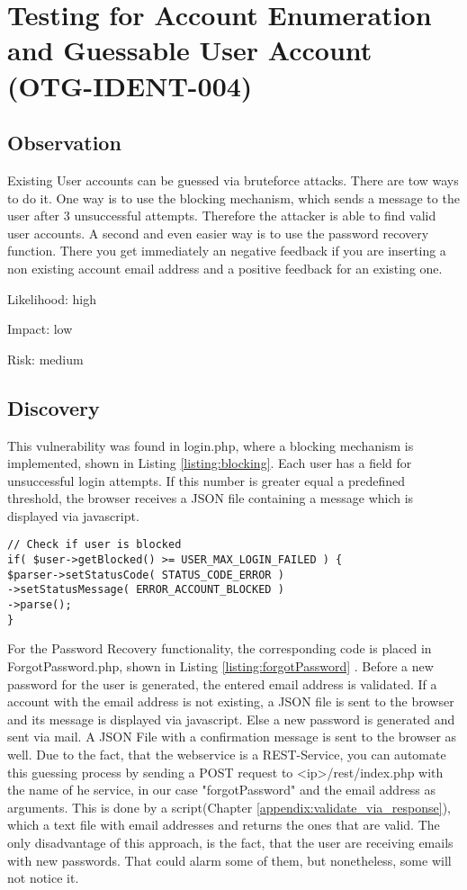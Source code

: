 \chapter{Testing for Account Enumeration and Guessable User Account (OTG-IDENT-004)}
\section{Observation}
Existing User accounts can be guessed via bruteforce attacks. There are tow ways to do it. One way is to use the blocking mechanism, which sends a message to the user after 3 unsuccessful attempts. Therefore the attacker is able to find valid user accounts.
A second and even easier way is to use the  password recovery function. There you get immediately an negative feedback if you are inserting a non existing account email address and a positive feedback for an existing  one.


Likelihood: high \newline

Impact: low\newline

Risk: medium\newline

\section{Discovery}
This vulnerability was found in login.php, where a blocking mechanism is implemented, shown in Listing \ref{listing:blocking}.  Each user has a field for unsuccessful login attempts. If this number is greater equal a predefined threshold, the browser  receives a JSON file containing a message which is displayed via javascript.
\begin{lstlisting}[caption= Blocking Mechanism in login.php line 54-59 ,label=listing:blocking]
// Check if user is blocked
if( $user->getBlocked() >= USER_MAX_LOGIN_FAILED ) {
$parser->setStatusCode( STATUS_CODE_ERROR )
->setStatusMessage( ERROR_ACCOUNT_BLOCKED )
->parse();
}
\end{lstlisting}

For the Password Recovery  functionality, the corresponding code is placed in ForgotPassword.php, shown in Listing \ref{listing:forgotPassword} . Before a new password for the user is generated, the entered email address is validated.  If a account with the email address is not existing, a JSON file is sent to the browser and its message is displayed via javascript. Else a new password is generated and sent via mail. A JSON File with a confirmation message is sent to the browser as well. Due to the fact, that the webservice is a REST-Service, you can automate this guessing process by sending a POST request to <ip>/rest/index.php with the name of he service, in our case "forgotPassword" and the email address as arguments. This is done by a script(Chapter \ref{appendix:validate_via_response}), which a text file with email addresses and returns the ones that are valid. The only disadvantage of this approach, is the fact, that the user are receiving emails with new passwords. That could alarm some of them, but nonetheless, some will not notice it.

